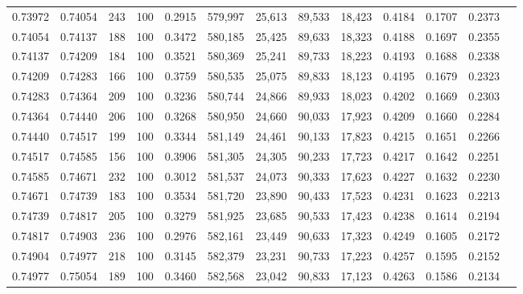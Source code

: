 \begin{tabular}{rrrrrrrrrrrrr}
0.73972 & 0.74054 &   243 & 100 &                                     0.2915 & 579,997 &  25,613 &  89,533 &  18,423 & 0.4184 & 0.1707 & 0.2373 \\
0.74054 & 0.74137 &   188 & 100 &                                     0.3472 & 580,185 &  25,425 &  89,633 &  18,323 & 0.4188 & 0.1697 & 0.2355 \\
0.74137 & 0.74209 &   184 & 100 &                                     0.3521 & 580,369 &  25,241 &  89,733 &  18,223 & 0.4193 & 0.1688 & 0.2338 \\
0.74209 & 0.74283 &   166 & 100 &                                     0.3759 & 580,535 &  25,075 &  89,833 &  18,123 & 0.4195 & 0.1679 & 0.2323 \\
0.74283 & 0.74364 &   209 & 100 &                                     0.3236 & 580,744 &  24,866 &  89,933 &  18,023 & 0.4202 & 0.1669 & 0.2303 \\
0.74364 & 0.74440 &   206 & 100 &                                     0.3268 & 580,950 &  24,660 &  90,033 &  17,923 & 0.4209 & 0.1660 & 0.2284 \\
0.74440 & 0.74517 &   199 & 100 &                                     0.3344 & 581,149 &  24,461 &  90,133 &  17,823 & 0.4215 & 0.1651 & 0.2266 \\
0.74517 & 0.74585 &   156 & 100 &                                     0.3906 & 581,305 &  24,305 &  90,233 &  17,723 & 0.4217 & 0.1642 & 0.2251 \\
0.74585 & 0.74671 &   232 & 100 &                                     0.3012 & 581,537 &  24,073 &  90,333 &  17,623 & 0.4227 & 0.1632 & 0.2230 \\
0.74671 & 0.74739 &   183 & 100 &                                     0.3534 & 581,720 &  23,890 &  90,433 &  17,523 & 0.4231 & 0.1623 & 0.2213 \\
0.74739 & 0.74817 &   205 & 100 &                                     0.3279 & 581,925 &  23,685 &  90,533 &  17,423 & 0.4238 & 0.1614 & 0.2194 \\
0.74817 & 0.74903 &   236 & 100 &                                     0.2976 & 582,161 &  23,449 &  90,633 &  17,323 & 0.4249 & 0.1605 & 0.2172 \\
0.74904 & 0.74977 &   218 & 100 &                                     0.3145 & 582,379 &  23,231 &  90,733 &  17,223 & 0.4257 & 0.1595 & 0.2152 \\
0.74977 & 0.75054 &   189 & 100 &                                     0.3460 & 582,568 &  23,042 &  90,833 &  17,123 & 0.4263 & 0.1586 & 0.2134 \\

\end{tabular}

